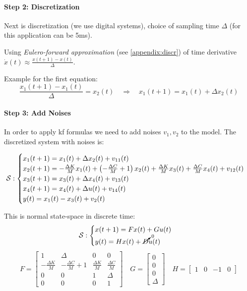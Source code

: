 \begin{example}
    \paragraph{Step 2: Discretization}
    Next is discretization (we use digital systems), choice of sampling time $\Delta$ (for this application can be 5ms).

    Using \emph{Eulero-forward approximation} (see \ref{appendix:discr}) of time derivative $\dot{x}(t) \approx \frac{x(t+1)-x(t)}{\Delta}$.

    Example for the first equation:
    \[
        \frac{x_1(t+1)-x_1(t)}{\Delta} = x_2(t) \quad\Rightarrow\quad x_1(t+1) = x_1(t) + \Delta x_2(t)
    \]

    \paragraph{Step 3: Add Noises} In order to apply \gls{kf} formulas we need to add noises $v_1, v_2$ to the model. 
    The discretized system with noises is:

    \[  
        \mathcal{S}:
        \begin{cases}
            x_1(t+1) = x_1(t) + \Delta x_2(t) + v_{11}(t) \\
            x_2(t+1) = -\frac{\Delta K}{M} x_1(t) + \left( -\frac{\Delta C}{M} + 1 \right)x_2(t) + \frac{\Delta K}{M} x_3(t) + \frac{\Delta C}{M} x_4(t) + v_{12}(t) \\
            x_3(t+1) = x_3(t) + \Delta x_4(t) + v_{13}(t) \\
            x_4(t+1) = x_4(t) + \Delta u(t) + v_{14}(t) \\
            y(t) = x_1(t) - x_3(t) + v_2(t)
        \end{cases}
    \]

    This is normal state-space in discrete time:
    \[  
        \mathcal{S}:
        \begin{cases}
            x(t+1) = Fx(t) + Gu(t) \\
            y(t) = Hx(t) + \cancelto{0}{D}u(t)
        \end{cases}
    \]
    \[
        F = \begin{bmatrix}
            1 & \Delta & 0 & 0 \\
            -\frac{\Delta K}{M} & -\frac{\Delta C}{M}+1 & \frac{\Delta K}{M} & \frac{\Delta C}{M} \\
            0 & 0 & 1 & \Delta \\
            0 & 0 & 0 & 1
        \end{bmatrix}
        \quad G = \begin{bmatrix}
            0 \\ 0 \\ 0 \\ \Delta
        \end{bmatrix}
        \quad H = \begin{bmatrix}
            1 & 0 & -1 & 0
        \end{bmatrix}
    \]


\end{example}
